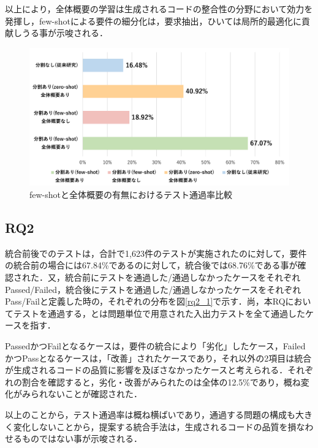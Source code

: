 \documentclass[submit,techrep,noauthor]{ipsj}
\begin{document}
以上により，全体概要の学習は生成されるコードの整合性の分野において効力を発揮し，few-shotによる要件の細分化は，要求抽出，ひいては局所的最適化に貢献しうる事が示唆される．


\begin{figure}[t]
    \centering
    \includegraphics[width=1.0\linewidth]{./Toyoshima_fig/SIGSE_fig1.pdf}
    \caption{few-shotと全体概要の有無におけるテスト通過率比較\protect\footnotemark}
    \label{ses2025}
\end{figure}

\subsection{RQ2}
統合前後でのテストは，合計で1,623件のテストが実施されたのに対して，要件の統合前の場合には67.84\%であるのに対して，統合後では68.76\%である事が確認された．又，統合前にテストを通過した/通過しなかったケースをそれぞれPassed/Failed，統合後にテストを通過した/通過しなかったケースをそれぞれPass/Failと定義した時の，それぞれの分布を図\ref{rq2_1}で示す．尚，本RQにおいてテストを通過する，とは問題単位で用意された入出力テストを全て通過したケースを指す．

PassedかつFailとなるケースは，要件の統合により「劣化」したケース，FailedかつPassとなるケースは，「改善」されたケースであり，それ以外の2項目は統合が生成されるコードの品質に影響を及ぼさなかったケースと考えられる．それぞれの割合を確認すると，劣化・改善がみられたのは全体の12.5\%であり，概ね変化がみられないことが確認された．

以上のことから，テスト通過率は概ね横ばいであり，通過する問題の構成も大きく変化しないことから，提案する統合手法は，生成されるコードの品質を損なわせるものではない事が示唆される．
\end{document}
